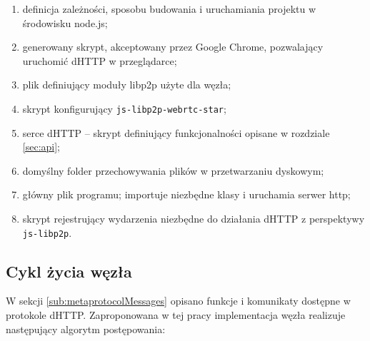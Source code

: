 \begin{enumerate}[noitemsep]
    \item definicja zależności, sposobu budowania i uruchamiania projektu w środowisku node.js;
    \item generowany skrypt, akceptowany przez Google Chrome, pozwalający uruchomić dHTTP w przeglądarce;
    \item plik definiujący moduły libp2p użyte dla węzła;
    \item skrypt konfigurujący \texttt{js-libp2p-webrtc-star};
    \item serce dHTTP -- skrypt definiujący funkcjonalności opisane w rozdziale \ref{sec:api};
    \item domyślny folder przechowywania plików w przetwarzaniu dyskowym;
    \item główny plik programu; importuje niezbędne klasy i uruchamia serwer http;
    \item skrypt rejestrujący wydarzenia niezbędne do działania dHTTP z perspektywy \texttt{js-libp2p}.
\end{enumerate}

\subsection{Cykl życia węzła}
\label{sec:transportAlgorithm}
W sekcji \ref{sub:metaprotocolMessages} opisano funkcje i komunikaty dostępne w protokole dHTTP. Zaproponowana w tej pracy implementacja węzła realizuje następujący algorytm postępowania:


